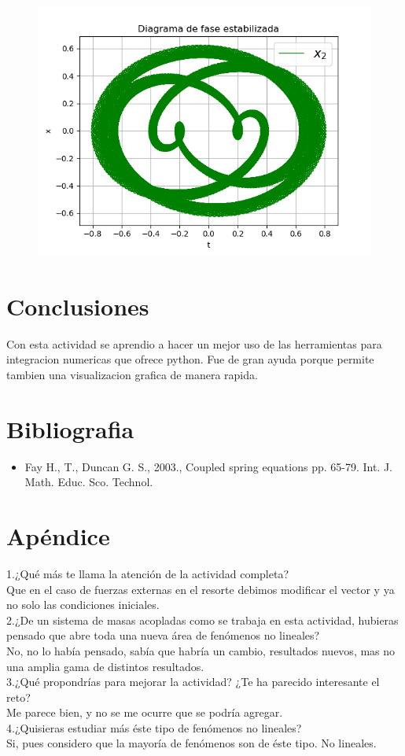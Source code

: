 \documentclass{article}
\begin{document}
\begin{figure}[H]
	\centering
    \includegraphics[width=\linewidth]{41_fe2.png}
\end{figure}
\section{Conclusiones}
Con esta actividad se aprendio a hacer un mejor uso de las herramientas para integracion numericas que ofrece python. Fue de gran ayuda porque permite tambien una visualizacion grafica de manera rapida.
\section{Bibliografia}
\begin{itemize}
\item Fay H., T., Duncan G. S., 2003., Coupled spring equations pp. 65-79. Int. J. Math. Educ. Sco. Technol.
\end{itemize}
\section{Apéndice}
1.¿Qué más te llama la atención de la actividad completa?\\
Que en el caso de fuerzas externas en el resorte debimos modificar el vector y ya no solo las condiciones iniciales.\\
2.¿De un sistema de masas acopladas como se trabaja en esta actividad, hubieras pensado que abre toda una nueva área de fenómenos no lineales?\\
No, no lo había pensado, sabía que habría un cambio, resultados nuevos, mas no una amplia gama de distintos resultados.\\
3.¿Qué propondrías para mejorar la actividad? ¿Te ha parecido interesante el reto?\\
Me parece bien, y no se me ocurre que se podría agregar.\\
4.¿Quisieras estudiar más éste tipo de fenómenos no lineales?\\
Si, pues considero que la mayoría de fenómenos son de éste tipo. No lineales.\\ 
\end{document}
